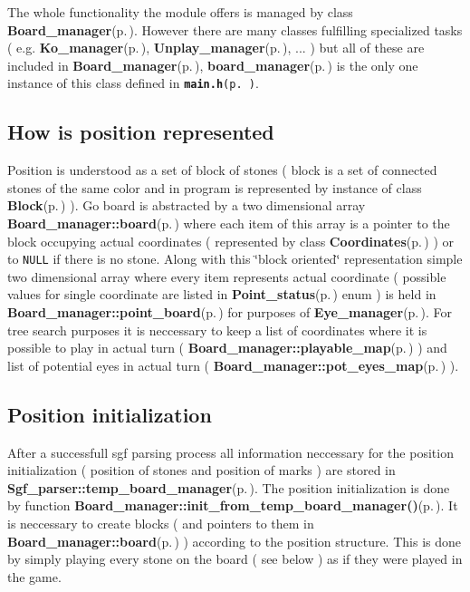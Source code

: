 The whole functionality the module offers is managed by class {\bf Board\_\-manager}{\rm (p.\,\pageref{classBoard__manager})}. However there are many classes fulfilling specialized tasks ( e.g. {\bf Ko\_\-manager}{\rm (p.\,\pageref{classKo__manager})}, {\bf Unplay\_\-manager}{\rm (p.\,\pageref{structUnplay__manager})}, ... ) but all of these are included in {\bf Board\_\-manager}{\rm (p.\,\pageref{classBoard__manager})}, {\bf board\_\-manager}{\rm (p.\,\pageref{main_8h_a1})} is the only one instance of this class defined in {\tt {\bf main.h}{\rm (p.\,\pageref{main_8h})}}.\subsection{How is position represented}\label{page_6_page_6__sec_1}
Position is understood as a set of block of stones ( block is a set of connected stones of the same color and in program is represented by instance of class {\bf Block}{\rm (p.\,\pageref{classBlock})} ). Go board is abstracted by a two dimensional array {\bf Board\_\-manager::board}{\rm (p.\,\pageref{classBoard__manager_r1})} where each item of this array is a pointer to the block occupying actual coordinates ( represented by class {\bf Coordinates}{\rm (p.\,\pageref{classCoordinates})} ) or to {\tt NULL} if there is no stone. Along with this \char`\"{}block oriented\char`\"{} representation simple two dimensional array where every item represents actual coordinate ( possible values for single coordinate are listed in {\bf Point\_\-status}{\rm (p.\,\pageref{board_8h_a51})} enum ) is held in {\bf Board\_\-manager::point\_\-board}{\rm (p.\,\pageref{classBoard__manager_o5})} for purposes of {\bf Eye\_\-manager}{\rm (p.\,\pageref{classEye__manager})}. For tree search purposes it is neccessary to keep a list of coordinates where it is possible to play in actual turn ( {\bf Board\_\-manager::playable\_\-map}{\rm (p.\,\pageref{classBoard__manager_r2})} ) and list of potential eyes in actual turn ( {\bf Board\_\-manager::pot\_\-eyes\_\-map}{\rm (p.\,\pageref{classBoard__manager_o0})} ).\subsection{Position initialization}\label{page_6_page_6__sec_2}
After a successfull sgf parsing process all information neccessary for the position initialization ( position of stones and position of marks ) are stored in {\bf Sgf\_\-parser::temp\_\-board\_\-manager}{\rm (p.\,\pageref{classSgf__parser_r12})}. The position initialization is done by function {\bf Board\_\-manager::init\_\-from\_\-temp\_\-board\_\-manager()}{\rm (p.\,\pageref{classBoard__manager_a14})}. It is neccessary to create blocks ( and pointers to them in {\bf Board\_\-manager::board}{\rm (p.\,\pageref{classBoard__manager_r1})} ) according to the position structure. This is done by simply playing every stone on the board ( see below ) as if they were played in the game. 

